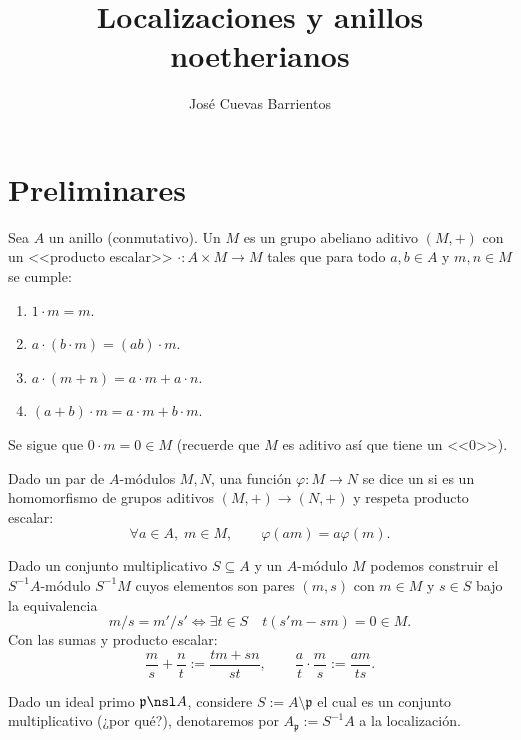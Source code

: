 \documentclass[11pt, reqno]{amsart}
\title{Localizaciones y anillos noetherianos}
\date{\DTMdate{2025-05-15}}
\author{José Cuevas Barrientos}
\begin{document}
\maketitle

\nocite{atiyah:commutative}
\nocite{jacobson:basic}

\section*{Preliminares}
Sea $A$ un anillo (conmutativo).
Un  $M$ es un grupo abeliano aditivo $(M, +)$ con un <<producto escalar>> $\cdot \colon A\times M \to
M$ tales que para todo $a, b \in A$ y $m, n \in M$ se cumple:
\begin{enumerate}
	\item $1\cdot m = m$.
	\item $a\cdot (b\cdot m) = (ab)\cdot m$.
	\item $a\cdot(m + n) = a\cdot m + a\cdot n$.
	\item $(a + b)\cdot m = a\cdot m + b\cdot m$.
\end{enumerate}
Se sigue que $0\cdot m = 0\in M$ (recuerde que $M$ es aditivo así que tiene un <<0>>).

Dado un par de $A$-módulos $M, N$, una función $\varphi \colon M \to N$ se dice un 
si es un homomorfismo de grupos aditivos $(M, +) \to (N, +)$ y respeta producto escalar:
\[
	\forall a \in A, \; m\in M, \qquad \varphi(am) = a \varphi(m).
\]

Dado un conjunto multiplicativo $S \subseteq A$ y un $A$-módulo $M$ podemos construir el $S^{-1}A$-módulo $S^{-1}M$
cuyos elementos son pares $(m, s)$ con $m \in M$ y $s \in S$ bajo la equivalencia
\[
	m/s = m'/s' \iff \exists t \in S \quad t(s'm - sm) = 0 \in M.
\]
Con las sumas y producto escalar:
\[
	\frac{m}{s} + \frac{n}{t} := \frac{tm + sn}{st}, \qquad \frac{a}{t} \cdot \frac{m}{s} := \frac{am}{ts}.
\]

Dado un ideal primo $\mathfrak{p} \nsl A$, considere $S := A \setminus \mathfrak{p}$ el cual es un conjunto
multiplicativo (¿por qué?), denotaremos por $A_{\mathfrak{p}} := S^{-1}A$ a la localización.
\end{document}
